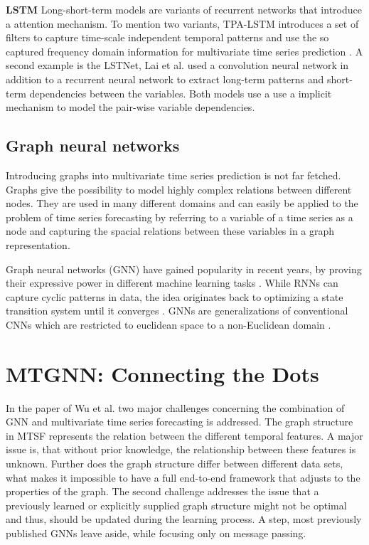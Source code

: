 \documentclass[letterpaper,twocolumn,11pt]{article}
\begin{document}
    \textbf{LSTM}  Long-short-term models are variants of recurrent networks that introduce a attention mechanism. To mention two variants, TPA-LSTM introduces a set of filters to capture time-scale independent temporal patterns and use the so captured frequency domain information  for multivariate time series prediction \cite{shih2019temporal}. A second example is the LSTNet, Lai et al. \cite{lai2018modeling} used a convolution neural network in addition to a recurrent neural network to extract long-term patterns and short-term dependencies between the variables. Both models use a use a implicit mechanism to model the pair-wise variable dependencies.

    \subsection{Graph neural networks}
Introducing graphs into multivariate time series prediction is not far fetched. Graphs give the possibility to model highly complex relations between different nodes. They are used in many different domains and can easily be applied to  the problem of time series forecasting by referring to a variable of a time series as a node and capturing the spacial relations between these variables in a graph representation.

Graph neural networks (GNN) have gained popularity in recent years, by proving their expressive power in different machine learning tasks \cite{zhou2020graph}. While RNNs can capture cyclic patterns in data, the idea originates back to optimizing a state transition system until it converges \cite{lecun1998gradient}. GNNs are generalizations of conventional CNNs which are restricted to euclidean space to a non-Euclidean domain \cite{bronstein2017geometric}.

    \section{MTGNN: Connecting the Dots}
    In the paper of Wu et al. \cite{wu2020connecting} two major challenges concerning the combination of GNN and multivariate
    time series forecasting is addressed.
    The graph structure in MTSF represents the relation between the different temporal features.
    A major issue is, that without prior knowledge, the relationship between these features is unknown.
    Further does the graph structure differ between different data sets, what makes it impossible to have a full end-to-end framework that adjusts to the properties of the graph.
    The second challenge addresses the issue that a previously learned or explicitly supplied graph structure might not be optimal and thus,
    should be updated during the learning process.
    A step, most previously published GNNs leave aside, while focusing only on message passing.
\end{document}
